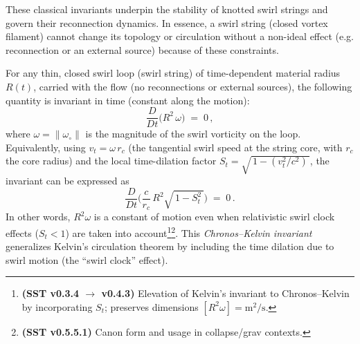 \documentclass[reprint,aps,onecolumn,nofootinbib]{revtex4-2}
\begin{document}
    These classical invariants underpin the stability of knotted swirl strings and govern their reconnection dynamics. In essence, a swirl string (closed vortex filament) cannot change its topology or circulation without a non-ideal effect (e.g. reconnection or an external source) because of these constraints.

    \begin{tcolorbox}[title=Axiom 1: Chronos–Kelvin Invariant]
    For any thin, closed swirl loop (swirl string) of time-dependent material radius $R(t)$, carried with the flow (no reconnections or external sources), the following quantity is invariant in time (constant along the motion):
    \[
        \frac{D}{Dt}\!\Big( R^2\,\omega \Big) \;=\; 0\,,
    \]
    where $\omega = \|\omega_{\circ}\|$ is the magnitude of the swirl vorticity on the loop. Equivalently, using $v_t = \omega\,r_c$ (the tangential swirl speed at the string core, with $r_c$ the core radius) and the local time-dilation factor $S_t = \sqrt{\,1 - (v_t^2/c^2)\,}$, the invariant can be expressed as
    \[
        \frac{D}{Dt}\!\Big( \frac{c}{r_c}\,R^2 \sqrt{\,1 - S_t^2\,}\Big) \;=\; 0\,.
    \]
    In other words, $R^2 \omega$ is a constant of motion even when relativistic swirl clock effects ($S_t<1$) are taken into account\footnote{\textbf{(SST v0.3.4 $\to$ v0.4.3)} Elevation of Kelvin’s invariant to Chronos–Kelvin by incorporating $S_t$; preserves dimensions $[R^2\omega]=\mathrm{m}^2/\mathrm{s}$.}\footnote{\textbf{(SST v0.5.5.1)} Canon form and usage in collapse/grav contexts.}. This \emph{Chronos–Kelvin invariant} generalizes Kelvin’s circulation theorem by including the time dilation due to swirl motion (the “swirl clock” effect).
    \end{tcolorbox}
\end{document}
